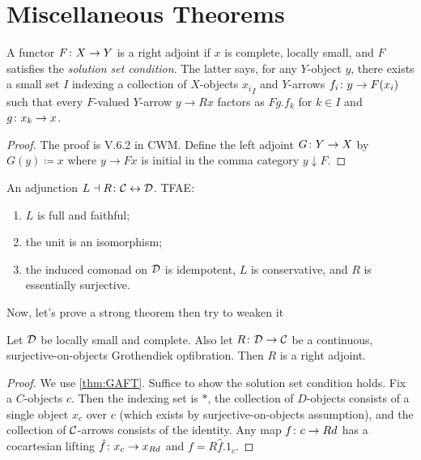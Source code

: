 \documentclass{amsart}
\begin{document}
\section{Miscellaneous Theorems}

\begin{thm}
\label{thm:GAFT}
	A functor $ F \colon X \to Y $ is a right adjoint if  $ x $ is complete, locally small, and $ F $ satisfies the \emph{solution set condition}. The latter says, for any $ Y $-object $ y $, there exists a small set $ I $ indexing a collection of $ X $-objects $ {x_i}_I $ and $ Y $-arrows $ {f_i \colon y \to F ( x_i ) } $ such that every $ F $-valued $ Y $-arrow $ y \to R x $ factors as $ Fg . f_k $ for $ k \in I $ and $ g \colon x_k \to x $.
\end{thm}

\begin{proof}
	The proof is V.6.2 in CWM.  Define the left adjoint $ G \colon Y \to X $ by $ G (y) \coloneqq x $ where $ y \to F x $ is initial in the comma category $ y \downarrow F $.  
\end{proof}

\begin{thm}
\label{thm:GabZis}
	An adjunction $ L \dashv R \colon \mathcal{C} \leftrightarrow \mathcal{D} $. TFAE:
	\begin{enumerate}
		\item $ L $ is full and faithful;
		\item the unit is an isomorphism;
		\item the induced comonad on $ \mathcal{D} $ is idempotent, $ L $ is conservative, and $ R $ is essentially surjective.
	\end{enumerate}
\end{thm}

Now, let's prove a strong theorem then try to weaken it

\begin{thm}
	Let $ \mathcal{D}$ be locally small and complete. Also let $ R \colon \mathcal{D} \to \mathcal{C} $ be a continuous, surjective-on-objects Grothendiek opfibration.  Then $ R $ is a right adjoint.
\end{thm}

\begin{proof}
	We use \ref{thm:GAFT}.  Suffice to show the solution set condition holds.  Fix a $ C $-objects $ c $.  Then the indexing set is $ \ast $, the collection of $ D $-objects consists of a single object $ x_c $ over $ c $ (which exists by surjective-on-objects assumption), and the collection of $ \mathcal{C} $-arrows consists of the identity.  Any map $ f \colon c \to Rd $ has a cocartesian lifting $ \hat{f} \colon x_c \to x_{Rd} $ and $ f = R \hat{f} . 1_c $.
\end{proof}
\end{document}
